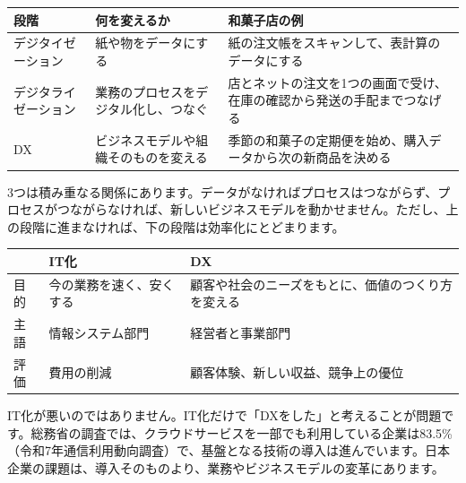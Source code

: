 \documentclass[paper=a4paper,fontsize=10pt,line_length=170mm,number_of_lines=46,baselineskip=1.6zw]{jlreq}
\newcommand\subhead[1]{\par\vspace{2.6mm}{\sffamily\bfseries\large #1}\par\vspace{1.3mm}}
\begin{document}
\begin{center}\small\renewcommand{\arraystretch}{1.15}\setlength{\tabcolsep}{1.5mm}
\begin{tabular}{|p{24.0mm}|p{68.0mm}|p{68.0mm}|}\arrayrulecolor{rulec}\hline
\rowcolor{papertwo}\sffamily\bfseries 段階 & \sffamily\bfseries 何を変えるか & \sffamily\bfseries 和菓子店の例\\\hline
デジタイゼーション & 紙や物をデータにする & 紙の注文帳をスキャンして、表計算のデータにする\\\hline
デジタライゼーション & 業務のプロセスをデジタル化し、つなぐ & 店とネットの注文を1つの画面で受け、在庫の確認から発送の手配までつなげる\\\hline
DX & ビジネスモデルや組織そのものを変える & 季節の和菓子の定期便を始め、購入データから次の新商品を決める\\\hline
\end{tabular}\end{center}\vspace{0.5mm}
3つは積み重なる関係にあります。データがなければプロセスはつながらず、プロセスがつながらなければ、新しいビジネスモデルを動かせません。ただし、上の段階に進まなければ、下の段階は効率化にとどまります。\par\vspace{1.2mm}
\subhead{従来の「IT化」との違い}
\begin{center}\small\renewcommand{\arraystretch}{1.15}\setlength{\tabcolsep}{1.5mm}
\begin{tabular}{|p{24.0mm}|p{68.0mm}|p{68.0mm}|}\arrayrulecolor{rulec}\hline
\rowcolor{papertwo}\sffamily\bfseries  & \sffamily\bfseries IT化 & \sffamily\bfseries DX\\\hline
目的 & 今の業務を速く、安くする & 顧客や社会のニーズをもとに、価値のつくり方を変える\\\hline
主語 & 情報システム部門 & 経営者と事業部門\\\hline
評価 & 費用の削減 & 顧客体験、新しい収益、競争上の優位\\\hline
\end{tabular}\end{center}\vspace{0.5mm}
IT化が悪いのではありません。IT化だけで「DXをした」と考えることが問題です。総務省の調査では、クラウドサービスを一部でも利用している企業は83.5\%（令和7年通信利用動向調査）で、基盤となる技術の導入は進んでいます。日本企業の課題は、導入そのものより、業務やビジネスモデルの変革にあります。\par\vspace{1.2mm}
\end{document}
